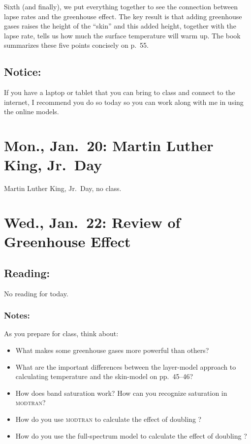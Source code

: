 \documentclass[
]{article}
\providecommand{\tightlist}{%
  \setlength{\itemsep}{0pt}\setlength{\parskip}{0pt}}
\newcommand{\COO}{\ce{CO2}}
\newcommand{\MODTRAN}{\textsc{modtran}}
\begin{document}
Sixth (and finally), we put everything together to see the connection
between lapse rates and the greenhouse effect. The key result is that
adding greenhouse gases raises the height of the ``skin'' and this added
height, together with the lapse rate, tells us how much the surface
temperature will warm up. The book summarizes these five points
concisely on p.~55.

\hypertarget{notice-2}{%
\subsection{Notice:}\label{notice-2}}

If you have a laptop or tablet that you can bring to class and connect
to the internet, I recommend you do so today so you can work along with
me in using the online models.

\hypertarget{mon.-jan.-20-martin-luther-king-jr.-day}{%
\section{Mon., Jan.~20: Martin Luther King,
Jr.~Day}\label{mon.-jan.-20-martin-luther-king-jr.-day}}

Martin Luther King, Jr.~Day, no class.

\hypertarget{wed.-jan.-22-review-of-greenhouse-effect}{%
\section{Wed., Jan.~22: Review of Greenhouse
Effect}\label{wed.-jan.-22-review-of-greenhouse-effect}}

\hypertarget{reading-6}{%
\subsection{Reading:}\label{reading-6}}

No reading for today.

\hypertarget{notes}{%
\subsubsection{Notes:}\label{notes}}

As you prepare for class, think about:

\begin{itemize}
\tightlist
\item
  What makes some greenhouse gases more powerful than others?
\item
  What are the important differences between the layer-model approach to
  calculating temperature and the skin-model on pp.~45--46?
\item
  How does band saturation work? How can you recognize saturation in
  \MODTRAN{}?
\item
  How do you use \MODTRAN{} to calculate the effect of doubling \COO{}?
\item
  How do you use the full-spectrum model to calculate the effect of
  doubling \COO{}?
\end{itemize}
\end{document}
